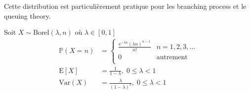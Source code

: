\documentclass[12pt, titlepage,french]{article}
\begin{document}
\begin{distributions}[Borel]
Cette distribution est particulièrement pratique pour les \guillemotleft branching process \guillemotright et le \guillemotleft queuing theory\guillemotright.

Soit $X \sim \text{Borel}(\lambda, n)$ où $\lambda \in [0, 1]$
\begin{align*}
	\mathds{P}(X = n)
	&=	\left\{ 
		\begin{matrix}
			\frac{\text{e}^{-\lambda n} \left(\lambda n\right)^{n - 1}}{n!}	&	n = 1, 2, 3, \dots	\\
			0	&	\text{autrement}	\\
		\end{matrix} 
		\right.	\\
	\text{E}[X]
	&=	\frac{1}{1 - \lambda}, \; 0 \le \lambda < 1	\\
	\text{Var}(X)
	&=	\frac{\lambda}{(1 - \lambda)^{3}}, \; 0 \le \lambda < 1	\\
\end{align*}
\end{distributions}
\end{document}
